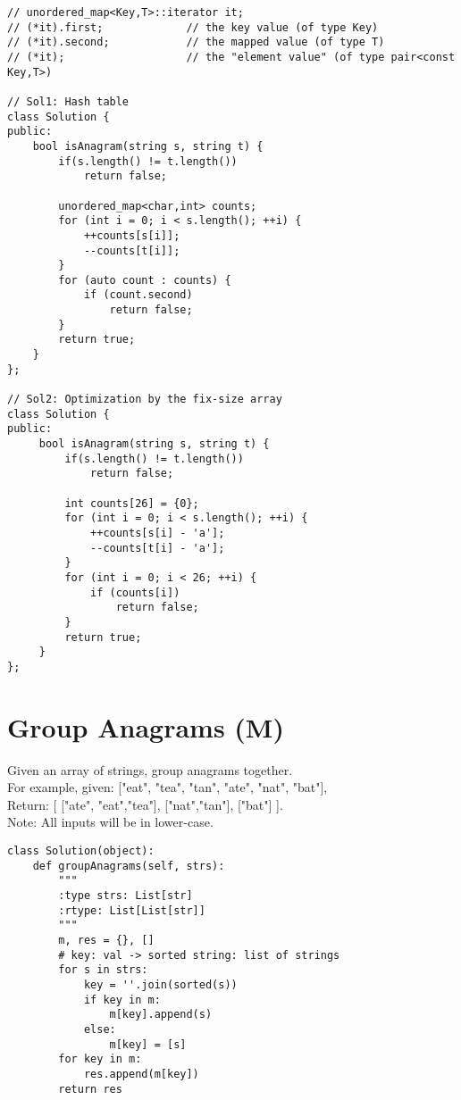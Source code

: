 \begin{lstlisting}
// unordered_map<Key,T>::iterator it;
// (*it).first;             // the key value (of type Key)
// (*it).second;            // the mapped value (of type T)
// (*it);                   // the "element value" (of type pair<const Key,T>)

// Sol1: Hash table
class Solution {
public:
    bool isAnagram(string s, string t) {
        if(s.length() != t.length())
            return false;
            
        unordered_map<char,int> counts;
        for (int i = 0; i < s.length(); ++i) {
            ++counts[s[i]];
            --counts[t[i]];
        }
        for (auto count : counts) {
            if (count.second)
                return false;
        }
        return true;
    }
};

// Sol2: Optimization by the fix-size array
class Solution {
public:
     bool isAnagram(string s, string t) {
         if(s.length() != t.length())
             return false;
            
         int counts[26] = {0};
         for (int i = 0; i < s.length(); ++i) {
             ++counts[s[i] - 'a'];
             --counts[t[i] - 'a'];
         }
         for (int i = 0; i < 26; ++i) {
             if (counts[i])
                 return false;
         }
         return true;
     }
};
\end{lstlisting}


\section{Group Anagrams (M)}
Given an array of strings, group anagrams together.\\

For example, given: ["eat", "tea", "tan", "ate", "nat", "bat"],\\
Return:
[
  ["ate", "eat","tea"],
  ["nat","tan"],
  ["bat"]
].\\

Note: All inputs will be in lower-case.\\
\begin{lstlisting}
class Solution(object):
    def groupAnagrams(self, strs):
        """
        :type strs: List[str]
        :rtype: List[List[str]]
        """
        m, res = {}, []
        # key: val -> sorted string: list of strings
        for s in strs:
            key = ''.join(sorted(s))
            if key in m:
                m[key].append(s)
            else:
                m[key] = [s]
        for key in m:
            res.append(m[key])
        return res
\end{lstlisting}

